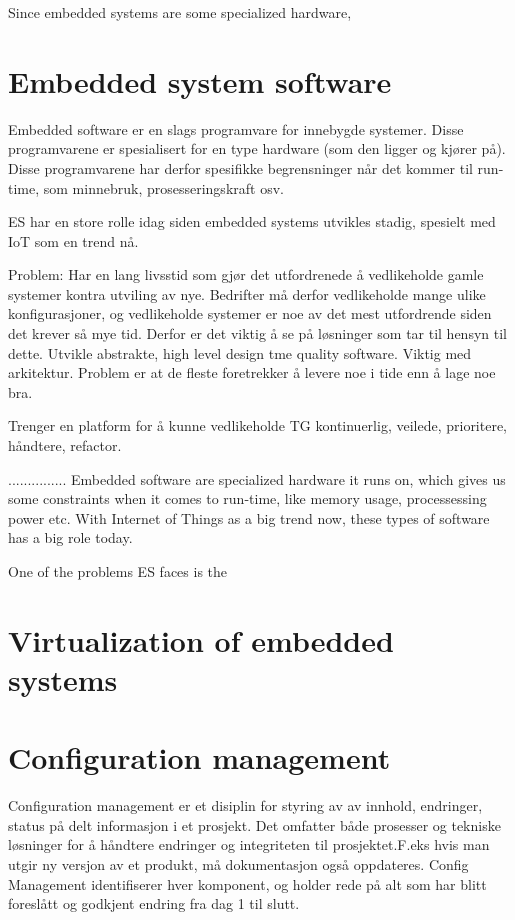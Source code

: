 Since embedded systems are some specialized hardware,


\section{Embedded system software}


Embedded software er en slags programvare for innebygde systemer. Disse programvarene er spesialisert for en type hardware (som den ligger og kjører på). Disse programvarene har derfor spesifikke begrensninger når det kommer til run-time, som minnebruk, prosesseringskraft osv.

ES har en store rolle idag siden embedded systems utvikles stadig, spesielt med IoT som en trend nå.

Problem: Har en lang livsstid som gjør det utfordrenede å vedlikeholde gamle systemer kontra utviling av nye. Bedrifter må derfor vedlikeholde mange ulike konfigurasjoner, og vedlikeholde systemer er noe av det mest utfordrende siden det krever så mye tid. Derfor er det viktig å se på løsninger som tar til hensyn til dette. Utvikle abstrakte, high level design tme quality software. Viktig med arkitektur. Problem er at de fleste foretrekker å levere noe i tide enn å lage noe bra.

Trenger en platform for å kunne vedlikeholde TG kontinuerlig, veilede, prioritere, håndtere, refactor.


...............
Embedded software are specialized hardware it runs on, which gives us some constraints when it comes to run-time, like memory usage, processessing power etc. With Internet of Things as a big trend now, these types of software has a big role today. 

One of the problems ES faces is the 

\section{Virtualization of embedded systems}


\section{Configuration management}
Configuration management er et disiplin for styring av av innhold, endringer, status på delt informasjon i et prosjekt. Det omfatter både prosesser og tekniske løsninger for å håndtere endringer og integriteten til prosjektet.F.eks hvis man utgir ny versjon av et produkt, må dokumentasjon også oppdateres. Config Management identifiserer hver komponent, og holder rede på alt som har blitt foreslått og godkjent endring fra dag 1 til slutt.

